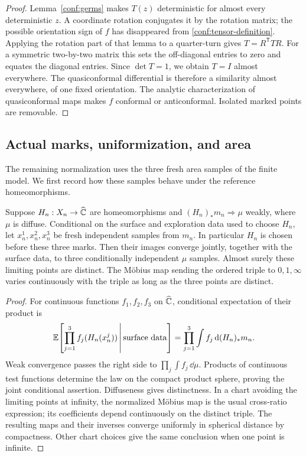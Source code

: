 \begin{proof}
Lemma~\ref{conf:germs} makes \(T(z)\) deterministic for almost
every deterministic \(z\).  A coordinate rotation conjugates it
by the rotation matrix; the possible orientation sign of \(f\)
has disappeared from \eqref{conf:tensor-definition}.  Applying
the rotation part of that lemma to a quarter-turn gives
\(T=R^{\mathsf T}TR\).  For a symmetric two-by-two matrix this
sets the off-diagonal entries to zero and equates the diagonal
entries.  Since \(\det T=1\), we obtain \(T=I\) almost
everywhere.  The quasiconformal differential is therefore a
similarity almost everywhere, of one fixed orientation.  The
analytic characterization of quasiconformal maps
\cite[Theorem~2.5.4]{AstalaIwaniecMartin2009} makes \(f\)
conformal or anticonformal.  Isolated marked points are removable.
\end{proof}

\subsection{Actual marks, uniformization, and area}
\label{conf:normalization-subsection}

The remaining normalization uses the three fresh area samples of the
finite model.  We first record how these samples behave under the
reference homeomorphisms.

\begin{lemma}
\label{joint:marks}
Suppose $H_n:X_n\to\widehat{\mathbb C}$ are homeomorphisms and
$(H_n)_*m_n\Rightarrow\mu$ weakly, where $\mu$ is diffuse. Conditional
on the surface and exploration data used to choose $H_n$, let
$x_n^1,x_n^2,x_n^3$ be fresh independent samples from $m_n$. In
particular $H_n$ is chosen before these three marks. Then their images
converge jointly, together with the surface data, to three conditionally independent $\mu$ samples.
Almost surely these limiting points are distinct. The M\"obius map
sending the ordered triple to $0,1,\infty$ varies continuously with
the triple as long as the three points are distinct.
\end{lemma}

\begin{proof}
For continuous functions $f_1,f_2,f_3$ on $\widehat{\mathbb C}$, conditional
expectation of their product is
\[
 \mathbb E\!\left[\prod_{j=1}^3 f_j(H_n(x_n^j))\,
        \middle|\,\text{surface data}\right]
   =\prod_{j=1}^3\int f_j\,\mathrm d(H_n)_*m_n.
\]
Weak convergence passes the right side to
$\prod_j\int f_j\,\dd\mu$. Products of continuous test functions
determine the law on the compact product sphere, proving the joint
conditional assertion. Diffuseness gives distinctness. In a chart
avoiding the limiting points at infinity, the normalized M\"obius
map is the usual cross-ratio expression; its coefficients depend
continuously on the distinct triple. The resulting maps and their
inverses converge uniformly in spherical distance by compactness.
Other chart choices give the same conclusion when one point is
infinite.
\end{proof}

